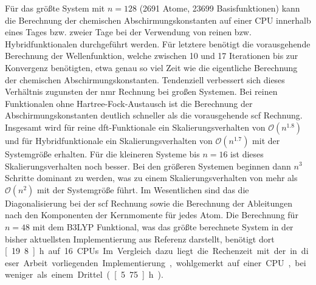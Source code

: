 \FloatBarrier

Für das größte System mit $n=128$ (2691 Atome, 23699 Basisfunktionen) kann die Berechnung der chemischen Abschirmungskonstanten auf einer CPU innerhalb eines Tages bzw. zweier Tage bei der Verwendung von reinen bzw. Hybridfunktionalen durchgeführt werden. Für letztere benötigt die vorausgehende Berechnung der Wellenfunktion, welche zwischen 10 und 17 Iterationen bis zur Konvergenz benötigten, etwa genau so viel Zeit wie die eigentliche Berechnung der chemischen Abschirmungskonstanten. Tendenziell verbessert sich dieses Verhältnis zugunsten der \ac{nmr} Rechnung bei großen Systemen. Bei reinen Funktionalen ohne Hartree-Fock-Austausch ist die Berechnung der Abschirmungskonstanten deutlich schneller als die vorausgehende \ac{scf} Rechnung. Insgesamt wird für reine \ac{dft}-Funktionale ein Skalierungsverhalten von $\mathcal{O}(n^{1.8})$ und für Hybridfunktionale ein Skalierungsverhalten von $\mathcal{O}(n^{1.7})$ mit der Systemgröße erhalten. Für die kleineren Systeme bis $n=16$ ist dieses Skalierungsverhalten noch besser. Bei den größeren Systemen beginnen dann $n^3$ Schritte dominant zu werden, was zu einem Skalierungsverhalten von mehr als $\mathcal{O}(n^{2})$ mit der Systemgröße führt. Im Wesentlichen sind das die Diagonalisierung bei der \ac{scf} Rechnung sowie die Berechnung der Ableitungen nach den Komponenten der Kernmomente für jedes Atom. Die Berechnung für $n=48$ mit dem B3LYP Funktional, was das größte berechnete System in der bisher aktuellsten Implementierung aus Referenz \cite{kumar2016nuclei} darstellt, benötigt dort \unit[19.8]{h} auf 16 CPUs. Im Vergleich dazu liegt die Rechenzeit mit der in dieser Arbeit vorliegenden Implementierung, wohlgemerkt auf einer CPU, bei weniger als einem Drittel (\unit[5.75]{h}). 

